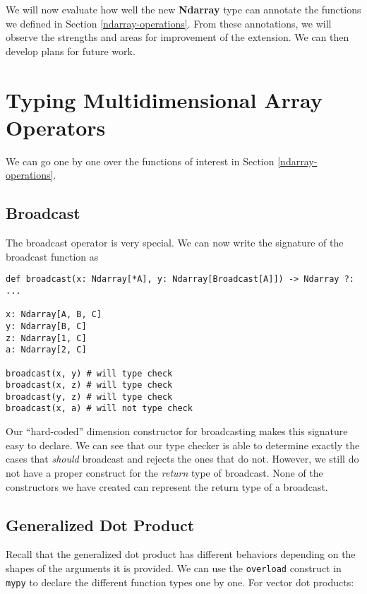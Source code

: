 \documentclass[12pt]{report}
\begin{document}
We will now evaluate how well the new \textbf{Ndarray} type can annotate the functions we defined in Section \ref{ndarray-operations}. From these annotations, we will observe the strengths and areas for improvement of the extension. We can then develop plans for future work.

\section{Typing Multidimensional Array Operators}
\label{type-examples}

We can go one by one over the functions of interest in Section \ref{ndarray-operations}.

\subsection{Broadcast}

The broadcast operator is very special. We can now write the signature of the broadcast function as

\begin{singlespace*}
\begin{verbatim}
def broadcast(x: Ndarray[*A], y: Ndarray[Broadcast[A]]) -> Ndarray ?: ...

x: Ndarray[A, B, C]
y: Ndarray[B, C]
z: Ndarray[1, C]
a: Ndarray[2, C]

broadcast(x, y) # will type check
broadcast(x, z) # will type check
broadcast(y, z) # will type check
broadcast(x, a) # will not type check\end{verbatim}
\end{singlespace*}
Our ``hard-coded'' dimension constructor for broadcasting makes this signature easy to declare. We can see that our type checker is able to determine exactly the cases that \textit{should} broadcast and rejects the ones that do not. However, we still do not have a proper construct for the \textit{return} type of broadcast. None of the constructors we have created can represent the return type of a broadcast.

\subsection{Generalized Dot Product}
Recall that the generalized dot product has different behaviors depending on the shapes of the arguments it is provided. We can use the \texttt{overload} construct in \texttt{mypy} to declare the different function types one by one. For vector dot products:
\end{document}
